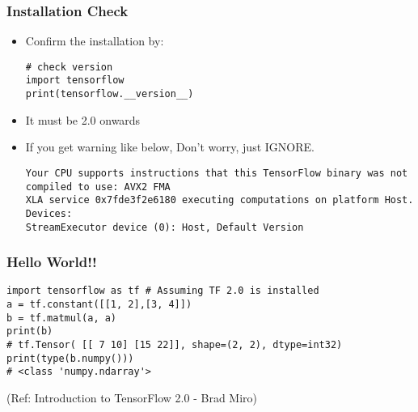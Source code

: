 \begin{frame}[fragile] \frametitle{Installation Check}

\begin{itemize}
\item Confirm the installation by:
\begin{lstlisting}
# check version
import tensorflow
print(tensorflow.__version__)
\end{lstlisting}
\item It must be 2.0 onwards
\item If you get warning like below, Don't worry, just IGNORE.
\begin{lstlisting}
Your CPU supports instructions that this TensorFlow binary was not compiled to use: AVX2 FMA
XLA service 0x7fde3f2e6180 executing computations on platform Host. Devices:
StreamExecutor device (0): Host, Default Version
\end{lstlisting}

\end{itemize}

\end{frame}

\begin{frame}[fragile] \frametitle{Hello World!!}

\begin{lstlisting}
import tensorflow as tf # Assuming TF 2.0 is installed
a = tf.constant([[1, 2],[3, 4]])
b = tf.matmul(a, a)
print(b) 
# tf.Tensor( [[ 7 10] [15 22]], shape=(2, 2), dtype=int32)
print(type(b.numpy()))
# <class 'numpy.ndarray'>
\end{lstlisting}


\tiny{(Ref: Introduction to TensorFlow 2.0 - Brad Miro)}
\end{frame}





